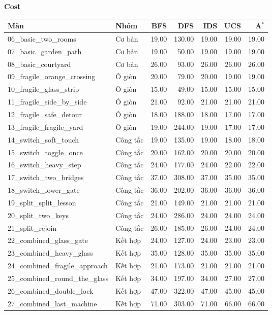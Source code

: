 \vspace{1.1em}

{\textbf{Cost}}\\[0.4em]
\begin{tabular}{llrrrrr}
\hline
Màn & Nhóm & BFS & DFS & IDS & UCS & A$^*$ \\
\hline
06\_basic\_two\_rooms & Cơ bản & 19.00 & 130.00 & 19.00 & 19.00 & 19.00 \\
07\_basic\_garden\_path & Cơ bản & 19.00 & 50.00 & 19.00 & 19.00 & 19.00 \\
08\_basic\_courtyard & Cơ bản & 26.00 & 93.00 & 26.00 & 26.00 & 26.00 \\
09\_fragile\_orange\_crossing & Ô giòn & 20.00 & 79.00 & 20.00 & 19.00 & 19.00 \\
10\_fragile\_glass\_strip & Ô giòn & 15.00 & 49.00 & 15.00 & 15.00 & 15.00 \\
11\_fragile\_side\_by\_side & Ô giòn & 21.00 & 92.00 & 21.00 & 21.00 & 21.00 \\
12\_fragile\_safe\_detour & Ô giòn & 18.00 & 188.00 & 18.00 & 17.00 & 17.00 \\
13\_fragile\_fragile\_yard & Ô giòn & 19.00 & 244.00 & 19.00 & 17.00 & 17.00 \\
14\_switch\_soft\_touch & Công tắc & 19.00 & 135.00 & 19.00 & 18.00 & 18.00 \\
15\_switch\_toggle\_once & Công tắc & 20.00 & 162.00 & 20.00 & 20.00 & 20.00 \\
16\_switch\_heavy\_step & Công tắc & 24.00 & 177.00 & 24.00 & 22.00 & 22.00 \\
17\_switch\_two\_bridges & Công tắc & 37.00 & 308.00 & 37.00 & 35.00 & 35.00 \\
18\_switch\_lower\_gate & Công tắc & 36.00 & 202.00 & 36.00 & 36.00 & 36.00 \\
19\_split\_split\_lesson & Công tắc & 21.00 & 149.00 & 21.00 & 21.00 & 21.00 \\
20\_split\_two\_keys & Công tắc & 24.00 & 286.00 & 24.00 & 24.00 & 24.00 \\
21\_split\_rejoin & Công tắc & 26.00 & 185.00 & 26.00 & 24.00 & 24.00 \\
22\_combined\_glass\_gate & Kết hợp & 24.00 & 127.00 & 24.00 & 23.00 & 23.00 \\
23\_combined\_heavy\_glass & Kết hợp & 35.00 & 128.00 & 35.00 & 35.00 & 35.00 \\
24\_combined\_fragile\_approach & Kết hợp & 21.00 & 173.00 & 21.00 & 21.00 & 21.00 \\
25\_combined\_round\_the\_glass & Kết hợp & 34.00 & 197.00 & 34.00 & 27.00 & 27.00 \\
26\_combined\_double\_lock & Kết hợp & 47.00 & 322.00 & 47.00 & 45.00 & 45.00 \\
27\_combined\_last\_machine & Kết hợp & 71.00 & 303.00 & 71.00 & 66.00 & 66.00 \\
\hline
\end{tabular}

\vspace{1.1em}
